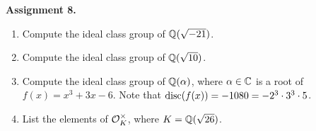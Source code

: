 {\bf Assignment 8.} 
\begin{enumerate}[leftmargin=1.5cm, label={{\bf A8-\arabic*}}]
    \item \label{A8-1} Compute the ideal class group of $\mathbb{Q}(\sqrt{-21})$.
    \item \label{A8-2} Compute the ideal class group of $\mathbb{Q}(\sqrt{10})$.
    \item \label{A8-3} Compute the ideal class group of $\mathbb{Q}(\alpha)$, 
    where $\alpha \in \mathbb{C}$ is a root of $f(x) = x^3 + 3x - 6$. Note that 
    $\operatorname{disc}(f(x)) = -1080 = -2^3 \cdot 3^3 \cdot 5$.
    \item \label{A8-4} List the elements of ${\cal O}_K^\times$, where 
    $K = \mathbb{Q}(\sqrt{26})$.
\end{enumerate}